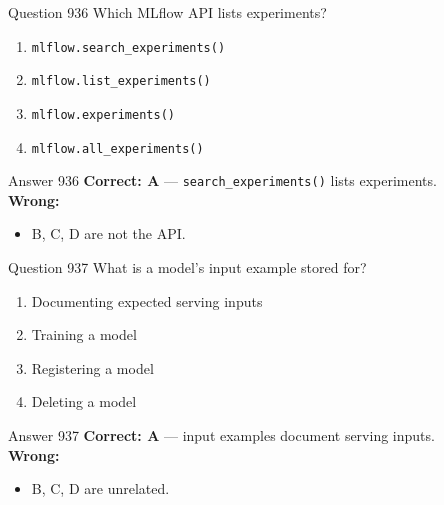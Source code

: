 \documentclass[aspectratio=169,11pt]{beamer}
\begin{document}
	\begin{frame}{Question 936}
		Which MLflow API lists experiments?
		\begin{enumerate}[label=\Alph*.]
			\item \texttt{mlflow.search\_experiments()}
			\item \texttt{mlflow.list\_experiments()}
			\item \texttt{mlflow.experiments()}
			\item \texttt{mlflow.all\_experiments()}
		\end{enumerate}
	\end{frame}
	\begin{frame}{Answer 936}
		\textbf{Correct: A} --- \texttt{search\_experiments()} lists experiments.\\
		\vspace{0.5em}
		\textbf{Wrong:}
		\begin{itemize}
			\item B, C, D are not the API.
		\end{itemize}
	\end{frame}
	
	\begin{frame}{Question 937}
		What is a model's input example stored for?
		\begin{enumerate}[label=\Alph*.]
			\item Documenting expected serving inputs
			\item Training a model
			\item Registering a model
			\item Deleting a model
		\end{enumerate}
	\end{frame}
	\begin{frame}{Answer 937}
		\textbf{Correct: A} --- input examples document serving inputs.\\
		\vspace{0.5em}
		\textbf{Wrong:}
		\begin{itemize}
			\item B, C, D are unrelated.
		\end{itemize}
	\end{frame}
	
\end{document}
